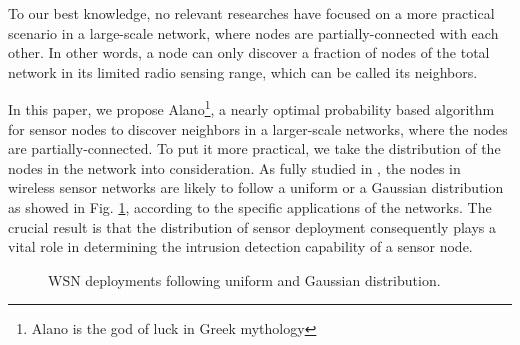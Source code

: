 To our best knowledge, no relevant researches have focused on a more 
practical scenario in a large-scale network, where nodes are partially-connected
with each other. In other words, a node can only discover a fraction of nodes of the
total network in its limited radio sensing range, which can be called its neighbors.


 
 In this paper, we propose Alano\footnote{Alano is the god of luck in Greek mythology }, 
a nearly optimal probability based algorithm for sensor nodes to discover neighbors  in a larger-scale networks,
 where the nodes are partially-connected. To put it more practical, 
 we take the distribution of the nodes in the network into consideration.
 As fully studied in \cite{wang2013gaussian} , the nodes in wireless sensor networks are likely to 
 follow a uniform or a Gaussian distribution as showed in Fig. \ref{distribution}, according to the specific applications of the networks.
 The crucial result is that the distribution of sensor deployment consequently plays a vital role in 
 determining the intrusion detection capability of a sensor node.


 
 \begin{figure}[!t]
\centering
{}
\vspace{0.03in}
\caption{WSN deployments following uniform and Gaussian distribution.}
\label{distribution}
\end{figure}



